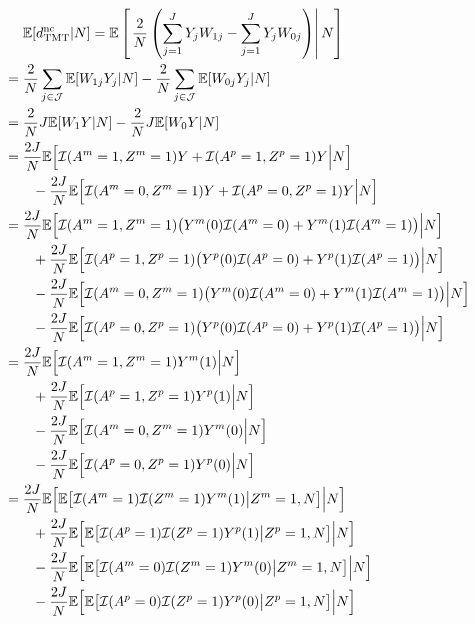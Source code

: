 \documentclass[12pt]{extarticle}
\newcommand{\E}{\mathbb{E}}
\newcommand{\nind}{J}
\newcommand{\indicator}{\mathcal{I}}
\newcommand{\tmt}{{\normalfont \text{TMT}}}
\newcommand{\dtmtnc}{d_{\tmt}^{\normalfont \text{nc}}}
\newcommand{\cJ}{\mathcal{J}}
\begin{document}
{\allowdisplaybreaks 
\begin{align}
& ~~~~ \E[\dtmtnc | N] = \E \left[ \left. \frac{2}{N}\left(\sum_{j=1}^J Y_jW_{1j} - \sum_{j=1}^JY_jW_{0j}\right) \right| N \right] \nonumber \\
\ & = \frac{2}{N} \sum_{j\in \cJ}\E[W_{1j}Y_j|N] - \frac{2}{N}\sum_{j\in \cJ}\E[W_{0j}Y_j|N] \nonumber \\
\ & = \frac{2}{N}\nind \E[W_1Y|N] - \frac{2}{N}\nind \E[W_0Y|N] \nonumber \\
\ &= \frac{2\nind}{N} \E\Big[\indicator(A^m=1,Z^m=1)Y + \indicator(A^p=1,Z^p=1)Y\Big|N\Big] \nonumber \\
\ & \qquad - \frac{2\nind}{N} \E\Big[\indicator(A^m=0,Z^m=1)Y + \indicator(A^p=0,Z^p=1)Y\Big|N\Big] \nonumber \\
\ & = \frac{2\nind}{N} \E\Big[\indicator(A^m=1,Z^m=1)\big(Y^m(0)\indicator(A^m=0)+Y^m(1)\indicator(A^m=1)\big) \Big|N\Big] \nonumber \\ 
\ & \qquad + \frac{2\nind}{N} \E\Big[\indicator(A^p=1,Z^p=1)\big(Y^p(0)\indicator(A^p=0)+Y^p(1)\indicator(A^p=1)\big) \Big|N\Big] \nonumber \\
\ & \qquad - \frac{2\nind}{N} \E\Big[\indicator(A^m=0,Z^m=1)\big(Y^m(0)\indicator(A^m=0)+Y^m(1)\indicator(A^m=1)\big) \Big|N\Big] \nonumber \\
\ & \qquad - \frac{2\nind}{N} \E\Big[\indicator(A^p=0,Z^p=1)\big(Y^p(0)\indicator(A^p=0)+Y^p(1)\indicator(A^p=1)\big) \Big|N\Big] \nonumber \\
\ & = \frac{2\nind}{N} \E\Big[\indicator(A^m=1,Z^m=1)Y^m(1) \Big|N\Big] \nonumber \\ 
\ & \qquad + \frac{2\nind}{N} \E\Big[\indicator(A^p=1,Z^p=1)Y^p(1) \Big|N\Big] \nonumber \\
\ & \qquad - \frac{2\nind}{N} \E\Big[\indicator(A^m=0,Z^m=1)Y^m(0) \Big|N\Big] \nonumber \\
\ & \qquad - \frac{2\nind}{N} \E\Big[\indicator(A^p=0,Z^p=1)Y^p(0) \Big|N\Big] \nonumber \\
\ & = \frac{2\nind}{N} \E\Big[\E\big[\indicator(A^m=1)\indicator(Z^m=1)Y^m(1)\big|Z^m=1, N\big]\Big|N \Big] \nonumber \\
\ & \qquad + \frac{2\nind}{N} \E\Big[\E\big[\indicator(A^p=1)\indicator(Z^p=1)Y^p(1)\big|Z^p=1, N\big]\Big|N \Big] \nonumber \\
\ & \qquad - \frac{2\nind}{N} \E\Big[\E\big[\indicator(A^m=0)\indicator(Z^m=1)Y^m(0)\big|Z^m=1, N\big]\Big|N \Big] \nonumber \\
\ & \qquad - \frac{2\nind}{N} \E\Big[\E\big[\indicator(A^p=0)\indicator(Z^p=1)Y^p(0)\big|Z^p=1, N\big]\Big|N \Big] \nonumber \\

\end{align}}
\end{document}
